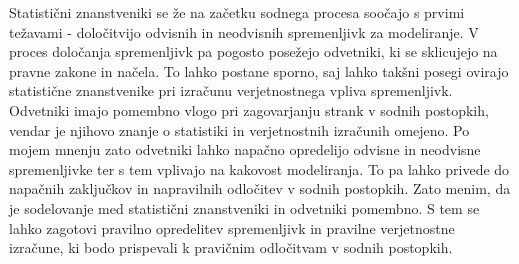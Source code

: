 \documentclass[12pt,a4paper]{amsart}
\theoremstyle{definition} %
\theoremstyle{plain} %
\begin{document}
Statistični znanstveniki se že na začetku sodnega procesa soočajo s prvimi težavami - določitvijo odvisnih in neodvisnih spremenljivk za modeliranje. V 
proces določanja spremenljivk pa pogosto posežejo odvetniki, ki se sklicujejo na pravne zakone in načela. To lahko postane sporno, saj lahko takšni 
posegi ovirajo statistične znanstvenike pri izračunu verjetnostnega vpliva spremenljivk. Odvetniki imajo pomembno vlogo pri zagovarjanju strank v 
sodnih postopkih, vendar je njihovo znanje o statistiki in verjetnostnih izračunih omejeno. Po mojem mnenju zato odvetniki lahko napačno opredelijo 
odvisne in neodvisne spremenljivke ter s tem vplivajo na kakovost modeliranja. To pa lahko privede do napačnih zaključkov in napravilnih odločitev v 
sodnih postopkih. Zato menim, da je sodelovanje med statistični znanstveniki in odvetniki pomembno. S tem se lahko zagotovi pravilno opredelitev 
spremenljivk in pravilne verjetnostne izračune, ki bodo prispevali k pravičnim odločitvam v sodnih postopkih.

\end{document}
